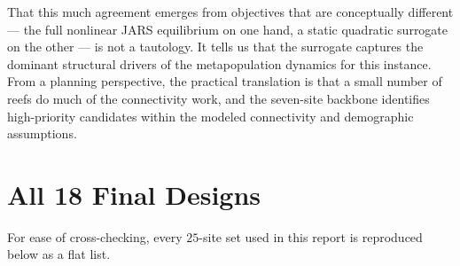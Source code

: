 \documentclass[11pt]{article}
\begin{document}
That this much agreement emerges from objectives that are conceptually different --- the full nonlinear JARS equilibrium on one hand, a static quadratic surrogate on the other --- is not a tautology. It tells us that the surrogate captures the dominant structural drivers of the metapopulation dynamics for this instance. From a planning perspective, the practical translation is that a small number of reefs do much of the connectivity work, and the seven-site backbone identifies high-priority candidates within the modeled connectivity and demographic assumptions.

\appendix

\section{All 18 Final Designs}

For ease of cross-checking, every $25$-site set used in this report is reproduced below as a flat list.
\end{document}
